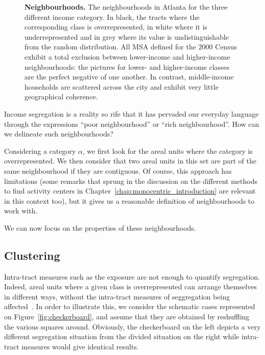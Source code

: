 \begin{figure}
    \caption{{\bf Neighbourhoods.} The neighbourhoods in Atlanta for the three different
      income category. In black, the tracts where the corresponding
      class is overrepresented, in white where it is
      underrepresented and in grey where its value is
      undistinguishable from the random distribution. All
      MSA defined for the $2000$ Census exhibit a total exclusion between
      lower-income and higher-income
      neighbourhoods: the pictures for lower- and higher-income classes are the
      perfect negative of one another. In contrast, middle-income households
      are scattered across the city and exhibit very little geographical coherence.}
\label{fig:atlanta_neighbourhoods}
\end{figure}

Income segregation is a reality so rife that it has pervaded our everyday
language through the expressions ``poor neighbourhood'' or ``rich
neighbourhood''. How can we delineate such neighbourhoods?

Considering a category $\alpha$,  we first look for the areal units where the
category is overrepresented. We then consider that two areal units in this set
are part of the same neighbourhood if they are contiguous. Of course, this
approach has limitations (some remarks that sprung in the discussion on the different methods to find
activity centers in Chapter~\ref{chap:monocentric_introduction} are relevant in
this context too), but it gives us a reasonable definition of neighbourhoods to
work with.

We can now focus on the properties of these neighbourhoods.

\subsection{Clustering}
\label{sub:clustering}

Intra-tract measures such as the exposure are not enough to quantify
segregation. Indeed, areal units where a given class is overrepresented can
arrange themselves in different ways, without the intra-tract measures of
seggregation being affected~\cite{White:1983}. In order to illustrate this, we
consider the schematic cases represented on Figure~\ref{fig:checkerboard}, and
assume that  they are obtained by reshuffling the various squares around.
Obviously, the checkerboard on the left depicts a very different segregation
situation from the divided situation on the right while intra-tract measures
would give identical results.\\

